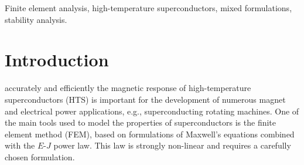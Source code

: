 \documentclass[journal]{IEEEtran}
\begin{document}
\begin{IEEEkeywords}
Finite element analysis, high-temperature superconductors, mixed formulations, stability analysis.
\end{IEEEkeywords}

\IEEEpeerreviewmaketitle


\section{Introduction}

 accurately and efficiently the magnetic response of high-temperature superconductors (HTS) is important for the development of numerous magnet and electrical power applications, e.g., superconducting rotating machines. One of the main tools used to model the properties of superconductors is the finite element method (FEM), based on formulations of Maxwell's equations combined with the $E$-$J$ power law. This law is strongly non-linear and requires a carefully chosen formulation.


\end{document}
